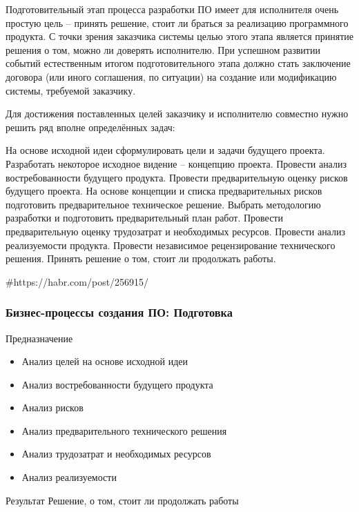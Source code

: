\documentclass{../industrial-development}
\begin{document}
Подготовительный этап процесса разработки ПО имеет для исполнителя очень простую цель – принять решение, стоит ли браться за реализацию программного продукта. С точки зрения заказчика системы целью этого этапа является принятие решения о том, можно ли доверять исполнителю. При успешном развитии событий естественным итогом подготовительного этапа должно стать заключение договора (или иного соглашения, по ситуации) на создание или модификацию системы, требуемой заказчику.

Для достижения поставленных целей заказчику и исполнителю совместно нужно решить ряд вполне определённых задач:

На основе исходной идеи сформулировать цели и задачи будущего проекта.
Разработать некоторое исходное видение – концепцию проекта.
Провести анализ востребованности будущего продукта.
Провести предварительную оценку рисков будущего проекта.
На основе концепции и списка предварительных рисков подготовить предварительное техническое решение.
Выбрать методологию разработки и подготовить предварительный план работ.
Провести предварительную оценку трудозатрат и необходимых ресурсов.
Провести анализ реализуемости продукта.
Провести независимое рецензирование технического решения.
Принять решение о том, стоит ли продолжать работы.

#https://habr.com/post/256915/

\begin{frame} \frametitle{Бизнес-процессы создания ПО: Подготовка}
	\begin{block}{Предназначение}
		\begin{itemize}
			\item Анализ целей на основе исходной идеи
			\item Анализ востребованности будущего продукта
			\item Анализ рисков
			\item Анализ предварительного технического решения
			\item Анализ трудозатрат и необходимых ресурсов
			\item Анализ реализуемости
		\end{itemize}
	\end{block}
	\begin{block}{Результат}
		Решение, о том, стоит ли продолжать работы
	\end{block}
\end{frame}
\lecturenotes
\end{document}
